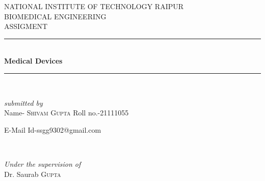 \documentclass[11pt]{article}
\date{}
\begin{document}
\date{}


\begin{titlepage} 
	\newcommand{\HRule}{\rule{\linewidth}{0.5mm}} %
	
	\center %
	
	
	
	\textsc{\LARGE NATIONAL INSTITUTE OF TECHNOLOGY   RAIPUR}\\[1.5cm] %
	
	\textsc{\Large BIOMEDICAL ENGINEERING }\\[0.5cm] %
	
	\textsc{\large ASSIGMENT}\\[0.5cm] %
	
	
	
	
	
	
	\HRule\\[0.4cm]
	
	{\huge\bfseries Medical Devices}\\[0.4cm] %
	
	\HRule\\[1.5cm]
	
	
	\begin{minipage}{0.4\textwidth}
		\begin{flushleft}
			\large
			\textit{submitted by}\\
			Name- \textsc{Shivam Gupta} %
			Roll no.-21111055 %
			
		E-Mail Id-ssgg9302@gmail.com %
			
			
		\end{flushleft}
	\end{minipage}
	~
	\begin{minipage}{0.4\textwidth}
		\begin{flushright}
			\large
			\textit{Under the supervision of}\\
			Dr. Saurab \textsc{Gupta} %
		\end{flushright}
	\end{minipage}
	

\end{titlepage}
\end{document}
